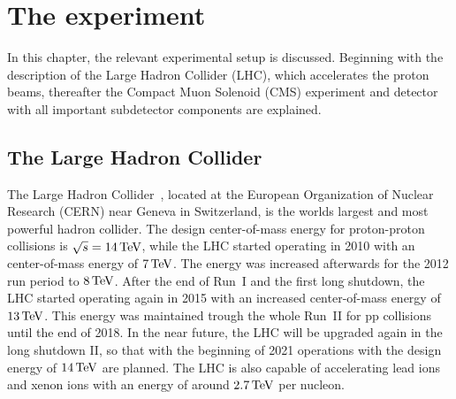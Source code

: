 \chapter{The experiment}\label{chap:experiment}
\minitoc
In this chapter, the relevant experimental setup is discussed. Beginning with the description of the Large Hadron Collider (LHC), which accelerates the proton beams, thereafter the Compact Muon Solenoid (CMS) experiment and detector with all important subdetector components are explained.
\section{The Large Hadron Collider}\label{sec:LHC}
The Large Hadron Collider~\cite{LHC1,LHC2}, located at the European Organization of Nuclear Research (CERN) near Geneva in Switzerland, is the worlds largest and most powerful hadron collider. The design center-of-mass energy for proton-proton collisions is $\sqrt{s}=14\,\text{Te\hspace{-.08em}V}$, while the LHC started operating in 2010 with an center-of-mass energy of $7\,\text{Te\hspace{-.08em}V}$. The energy was increased afterwards for the 2012 run period to $8\,\text{Te\hspace{-.08em}V}$. After the end of Run~I and the first long shutdown, the LHC started operating again in 2015 with an increased center-of-mass energy of $13\,\text{Te\hspace{-.08em}V}$. This energy was maintained trough the whole Run~II for pp collisions until the end of 2018. In the near future, the LHC will be upgraded again in the long shutdown II, so that with the beginning of 2021 operations with the design energy of $14\,\text{Te\hspace{-.08em}V}$ are planned.
The LHC is also capable of accelerating lead ions and xenon ions with an energy of around $2.7\,\text{Te\hspace{-.08em}V}$ per nucleon.\\
